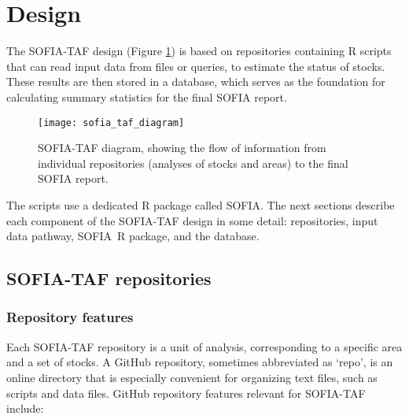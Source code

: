 \documentclass[12pt]{article}
\newcommand\SOFIA{{\sf SOFIA}}
\begin{document}
\newpage


\section{Design}

The SOFIA-TAF design (Figure \ref{fig:sofia-taf-diagram}) is based on
repositories containing R scripts that can read input data from files or
queries, to estimate the status of stocks. These results are then stored in a
database, which serves as the foundation for calculating summary statistics for
the final SOFIA report.

\begin{figure}[htb]
  \begin{center}
    \texttt{[image: sofia\_taf\_diagram]}
    \vspace{2ex}
    \caption{SOFIA-TAF diagram, showing the flow of information from individual
      repositories (analyses of stocks and areas) to the final SOFIA report.}
    \label{fig:sofia-taf-diagram}
  \end{center}
\end{figure}

The scripts use a dedicated R package called \SOFIA. The next sections describe
each component of the SOFIA-TAF design in some detail: repositories, input data
pathway, \SOFIA\ R package, and the database.

\subsection{SOFIA-TAF repositories}

\subsubsection{Repository features}

Each SOFIA-TAF repository is a unit of analysis, corresponding to a specific
area and a set of stocks. A GitHub repository, sometimes abbreviated as `repo',
is an online directory that is especially convenient for organizing text files,
such as scripts and data files. GitHub repository features relevant for
SOFIA-TAF include:
\end{document}
